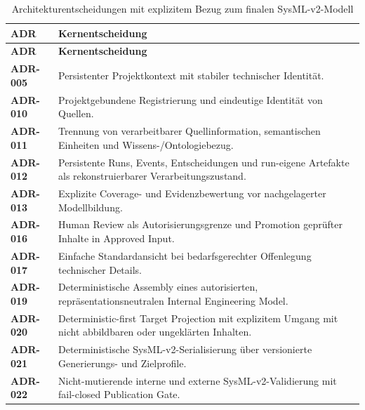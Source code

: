 \begingroup
\small
\begin{xltabular}{\textwidth}{@{}p{1.6cm}X@{}}
\caption[Architekturentscheidungen mit Modellbezug]{Architekturentscheidungen mit explizitem Bezug zum finalen SysML-v2-Modell}
\label{tab:adr_decision_overview}\\
\hline
\textbf{ADR} & \textbf{Kernentscheidung}\\
\hline
\endfirsthead
\hline
\textbf{ADR} & \textbf{Kernentscheidung}\\
\hline
\endhead

\textbf{ADR-005} &
Persistenter Projektkontext mit stabiler technischer Identität.\\

\textbf{ADR-010} &
Projektgebundene Registrierung und eindeutige Identität von Quellen.\\

\textbf{ADR-011} &
Trennung von verarbeitbarer Quellinformation, semantischen Einheiten und Wissens-/Ontologiebezug.\\

\textbf{ADR-012} &
Persistente Runs, Events, Entscheidungen und run-eigene Artefakte als rekonstruierbarer Verarbeitungszustand.\\

\textbf{ADR-013} &
Explizite Coverage- und Evidenzbewertung vor nachgelagerter Modellbildung.\\

\textbf{ADR-016} &
Human Review als Autorisierungsgrenze und Promotion geprüfter Inhalte in Approved Input.\\

\textbf{ADR-017} &
Einfache Standardansicht bei bedarfsgerechter Offenlegung technischer Details.\\

\textbf{ADR-019} &
Deterministische Assembly eines autorisierten, repräsentationsneutralen Internal Engineering Model.\\

\textbf{ADR-020} &
Deterministic-first Target Projection mit explizitem Umgang mit nicht abbildbaren oder ungeklärten Inhalten.\\

\textbf{ADR-021} &
Deterministische SysML-v2-Serialisierung über versionierte Generierungs- und Zielprofile.\\

\textbf{ADR-022} &
Nicht-mutierende interne und externe SysML-v2-Validierung mit fail-closed Publication Gate.\\


\end{xltabular}
